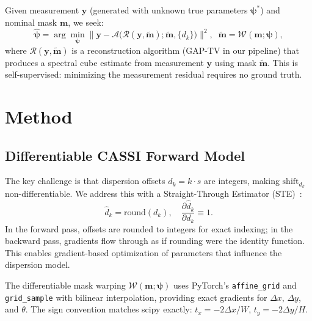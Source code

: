 \documentclass[runningheads]{llncs}
\begin{document}
Given measurement $\mathbf{y}$ (generated with unknown true parameters $\boldsymbol{\psi}^*$) and nominal mask $\mathbf{m}$, we seek:
\begin{equation}
\label{eq:objective}
    \hat{\boldsymbol{\psi}} = \arg\min_{\boldsymbol{\psi}} \bigl\| \mathbf{y} - \mathcal{A}\bigl(\mathcal{R}(\mathbf{y}, \tilde{\mathbf{m}}); \tilde{\mathbf{m}}, \{d_k\}\bigr) \bigr\|^2, \;\; \tilde{\mathbf{m}} = \mathcal{W}(\mathbf{m}; \boldsymbol{\psi}),
\end{equation}
where $\mathcal{R}(\mathbf{y}, \tilde{\mathbf{m}})$ is a reconstruction algorithm (GAP-TV in our pipeline) that produces a spectral cube estimate from measurement $\mathbf{y}$ using mask $\tilde{\mathbf{m}}$.
This is self-supervised: minimizing the measurement residual requires no ground truth.

\section{Method}
\label{sec:method}

\subsection{Differentiable CASSI Forward Model}

The key challenge is that dispersion offsets $d_k = k \cdot s$ are integers, making $\text{shift}_{d_k}$ non-differentiable.
We address this with a Straight-Through Estimator (STE)~\cite{bengio2013ste}:
\begin{equation}
\label{eq:ste}
    \hat{d}_k = \text{round}(d_k), \quad \frac{\partial \hat{d}_k}{\partial d_k} \equiv 1.
\end{equation}
In the forward pass, offsets are rounded to integers for exact indexing; in the backward pass, gradients flow through as if rounding were the identity function.
This enables gradient-based optimization of parameters that influence the dispersion model.

The differentiable mask warping $\mathcal{W}(\mathbf{m}; \boldsymbol{\psi})$ uses PyTorch's \texttt{affine\_grid} and \texttt{grid\_sample} with bilinear interpolation, providing exact gradients for $\Delta x$, $\Delta y$, and $\theta$.
The sign convention matches scipy exactly: $t_x = -2\Delta x / W$, $t_y = -2\Delta y / H$.
\end{document}
